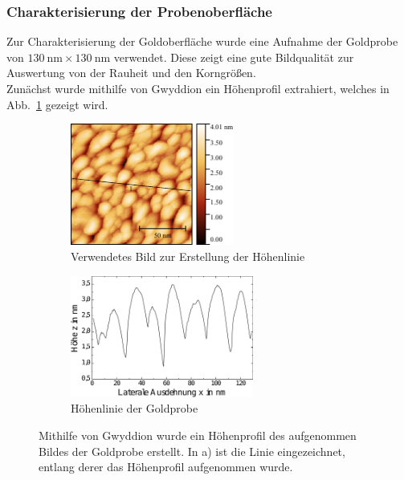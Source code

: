 \documentclass[a4paper,twoside,final]{article}
\begin{document}
\subsubsection{Charakterisierung der Probenoberfläche}
Zur Charakterisierung der Goldoberfläche wurde eine Aufnahme der Goldprobe von $\SI{130}{\nano\metre}\times\SI{130}{\nano\metre}$ verwendet. Diese zeigt eine gute Bildqualität zur Auswertung von der Rauheit und den Korngrößen.\\
Zunächst wurde mithilfe von Gwyddion ein Höhenprofil extrahiert, welches in Abb.~\ref{fig:HoehenprofilGold} gezeigt wird.
\begin{figure}[htp]
    \centering
    \begin{subfigure}{0.45\textwidth}
        \includegraphics[height=4cm]{Bilder/Image01963_Bild_Hoehenprofil.pdf}
        \caption{Verwendetes Bild zur Erstellung der Höhenlinie}
    \end{subfigure}
    \hspace{0.5cm}
    \begin{subfigure}{0.45\textwidth}
        \includegraphics[height=4cm]{Bilder/Image01963_Hoehenprofil.pdf}
        \caption{Höhenlinie der Goldprobe\\}
    \end{subfigure}
    \caption{Mithilfe von Gwyddion wurde ein Höhenprofil des aufgenommen Bildes der Goldprobe erstellt. In a) ist die Linie eingezeichnet, entlang derer das Höhenprofil aufgenommen wurde.}
    \label{fig:HoehenprofilGold}
\end{figure}\\
\end{document}
